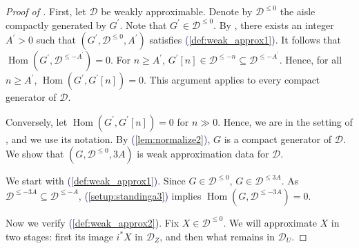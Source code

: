 \documentclass[11pt]{amsart}
\def\eqref#1{\textcolor{darkblue}{(\ref{#1})}}
\theoremstyle{plain}
\theoremstyle{definition}
\numberwithin{equation}{section}
\numberwithin{theorem}{section}
\begin{document}
\begin{proof}
    [Proof of ]
    First, let $\mathcal{D}$ be weakly approximable.
    Denote by $\mathcal{D}^{\leq 0}$ the aisle compactly generated by $G^\prime$.
    Note that $G^\prime\in \mathcal{D}^{\leq 0}$.
    By \cite[Lemma 3.7]{Burke/Neeman/Pauwels:2023}, there exists an integer $A^\prime>0$ such that $(G^\prime,\mathcal{D}^{\leq 0},A^\prime)$ satisfies \eqref{def:weak_approx1}.
    It follows that $\operatorname{Hom}(G^\prime,\mathcal{D}^{\leq -A^\prime})=0$.
    For $n\geq A^\prime$, $G^\prime[n]\in \mathcal{D}^{\leq -n}\subseteq \mathcal{D}^{\leq -A^\prime}$.
    Hence, for all $n\geq A^\prime$, $\operatorname{Hom}(G^\prime,G^\prime[n])=0$.
    This argument applies to every compact generator of $\mathcal{D}$.

    Conversely, let $\operatorname{Hom}(G^\prime,G^\prime[n])=0$ for $n\gg 0$.
    Hence, we are in the setting of , and we use its notation. 
    By \eqref{lem:normalize2}, $G$ is a compact generator of $\mathcal{D}$.
    We show that $(G,\mathcal{D}^{\leq 0},3A)$ is weak approximation data for $\mathcal{D}$.

    We start with \eqref{def:weak_approx1}.
    Since $G\in \mathcal{D}^{\leq 0}$, $G\in \mathcal{D}^{\leq 3A}$.
    As $\mathcal{D}^{\leq -3A}\subseteq \mathcal{D}^{\leq -A}$, \eqref{setup:standinga3} implies $\operatorname{Hom}(G,\mathcal{D}^{\leq -3A})=0$.

    Now we verify \eqref{def:weak_approx2}.
    Fix $X\in \mathcal{D}^{\leq 0}$.
    We will approximate $X$ in two stages: first its image $i^\ast X$ in $\mathcal{D}_Z$, and then what remains in $\mathcal{D}_U$.


\end{proof}
\end{document}

